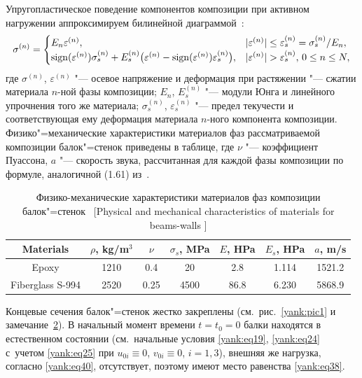 Упругопластическое поведение компонентов композиции при активном нагружении аппроксимируем билинейной диаграммой~\cite{yank:bib24}:
\begin{equation}
\label{yank:eq43}
\sigma ^{(n)}=\begin{cases}
E_n \varepsilon ^{(n)}, & |\varepsilon ^{(n)}  |\le \varepsilon _s^{(n)} =\sigma _s^{(n)} /E_n, \\
\mathop{\rm sign} (\varepsilon ^{(n)} )\sigma _s^{(n)} +E_s^{(n)} \bigl(\varepsilon^{(n)}- \mathop{\rm sign} (\varepsilon
^{(n)} )\varepsilon_s^{(n)} \bigr),& |\varepsilon ^{(n)} |>\varepsilon _s^{(n)},\, 0\le
n\le N,
\end{cases}
\end{equation}
где $\sigma ^{(n)}$, $\varepsilon ^{(n)}$ "--- осевое напряжение и деформация
при растяжении "--- сжатии материала $n$-ной фазы композиции; $E_n$,
$E_s^{(n)} $ "--- модули Юнга и линейного упрочнения того же материала;
$\sigma _s^{(n)}$, $\varepsilon_s^{(n)}$ "--- предел
текучести и соответствующая ему деформация материала $n$-ного компонента
композиции. Физико"=механические характеристики материалов фаз
рассматриваемой композиции балок"=стенок приведены в таблице, где $\nu $ "---
коэффициент Пуассона, $a$ "--- скорость звука, рассчитанная для каждой фазы
композиции по формуле, аналогичной (1.61) из~\cite{yank:bib13}.


\begin{table}[h!]\centering\small
\caption*{\footnotesize Физико-механические характеристики материалов фаз композиции балок"=стенок~\cite{yank:bib25,yank:bib26} 
[Physical and mechanical characteristics of materials for beams-walls \cite{yank:bib25,yank:bib26}]}
\vspace{-3mm}
\renewcommand{\tabcolsep}{0.31cm}
\begin{tabular}{|c|c|c|c|c|c|c|}
\hline
\footnotesize  Materials & \footnotesize  $\rho$, kg/m$^3$ & \footnotesize  $\nu$ & \footnotesize  $\sigma_s$, MPa & \footnotesize  $E$, HPa & \footnotesize  $E_s$, HPa & \footnotesize  $a$, m/s \\ 
\hline
\rule{0mm}{12pt}%
Epoxy & 1210 & 0.4 & 20 & 2.8 & 1.114 & 1521.2 \\
Fiberglass S-994 & 2520 & 0.25 & 4500 & 86.8 & 6.230 & 5868.9 \\ \hline
\end{tabular}
\end{table}


Концевые сечения балок"=стенок жестко закреплены (см.~рис.~\ref{yank:pic1} и замечание~\hyperlink{yan:rem:2}{2}).
В начальный момент времени $t=t_0 =0$ балки находятся в естественном
состоянии (см.~начальные условия \eqref{yank:eq19}, \eqref{yank:eq24} с~учетом \eqref{yank:eq25} при $u_{0i} \equiv
0$, $v_{0i} \equiv 0$, $i=1,3$), внешняя же нагрузка, согласно \eqref{yank:eq40},
отсутствует, поэтому имеют место равенства \eqref{yank:eq38}.

